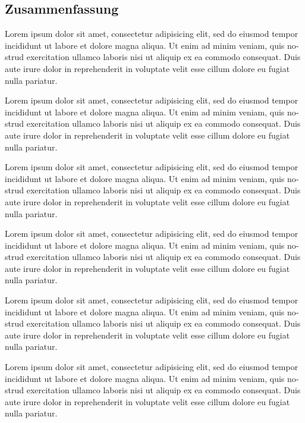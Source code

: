 \begin{otherlanguage}{ngerman}
\chapter*{Zusammenfassung}\label{chapter:zusammenfassung}
 Lorem ipsum dolor sit amet, consectetur adipisicing elit, sed do eiusmod
tempor incididunt ut labore et dolore magna aliqua. Ut enim ad minim veniam, quis
nostrud exercitation ullamco laboris nisi ut aliquip ex ea commodo consequat. Duis aute
irure dolor in reprehenderit in voluptate velit esse cillum dolore eu fugiat nulla pariatur.


 Lorem ipsum dolor sit amet, consectetur adipisicing elit, sed do eiusmod
tempor incididunt ut labore et dolore magna aliqua. Ut enim ad minim veniam, quis
nostrud exercitation ullamco laboris nisi ut aliquip ex ea commodo consequat. Duis aute
irure dolor in reprehenderit in voluptate velit esse cillum dolore eu fugiat nulla pariatur.


 Lorem ipsum dolor sit amet, consectetur adipisicing elit, sed do eiusmod
tempor incididunt ut labore et dolore magna aliqua. Ut enim ad minim veniam, quis
nostrud exercitation ullamco laboris nisi ut aliquip ex ea commodo consequat. Duis aute
irure dolor in reprehenderit in voluptate velit esse cillum dolore eu fugiat nulla pariatur.


 Lorem ipsum dolor sit amet, consectetur adipisicing elit, sed do eiusmod
tempor incididunt ut labore et dolore magna aliqua. Ut enim ad minim veniam, quis
nostrud exercitation ullamco laboris nisi ut aliquip ex ea commodo consequat. Duis aute
irure dolor in reprehenderit in voluptate velit esse cillum dolore eu fugiat nulla pariatur.


 Lorem ipsum dolor sit amet, consectetur adipisicing elit, sed do eiusmod
tempor incididunt ut labore et dolore magna aliqua. Ut enim ad minim veniam, quis
nostrud exercitation ullamco laboris nisi ut aliquip ex ea commodo consequat. Duis aute
irure dolor in reprehenderit in voluptate velit esse cillum dolore eu fugiat nulla pariatur.


 Lorem ipsum dolor sit amet, consectetur adipisicing elit, sed do eiusmod
tempor incididunt ut labore et dolore magna aliqua. Ut enim ad minim veniam, quis
nostrud exercitation ullamco laboris nisi ut aliquip ex ea commodo consequat. Duis aute
irure dolor in reprehenderit in voluptate velit esse cillum dolore eu fugiat nulla pariatur.

\doit
\end{otherlanguage}

